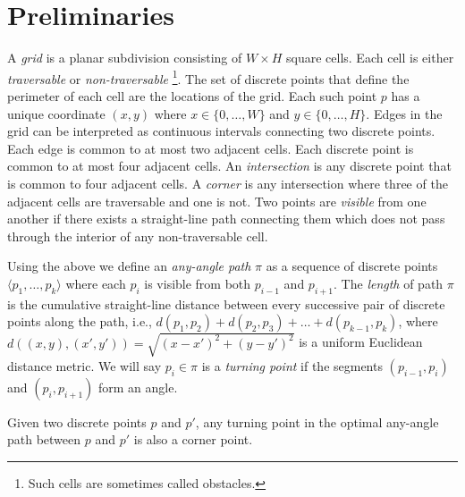 \section{Preliminaries}
A \emph{grid} is a planar subdivision consisting of $W \times H$ square cells.
Each cell is either \emph{traversable} or \emph{non-traversable}
\footnote{Such cells are sometimes called obstacles.}.
The set of discrete points that define the perimeter of each cell are the locations
of the grid. Each such point $p$ has a unique coordinate $(x, y)$
where $x \in \{0,\dots,W\}$ and $y \in \{0,\dots,H\}$.
Edges in the grid can be interpreted as continuous intervals connecting two 
discrete points. Each edge is common to at most two adjacent cells. Each discrete 
point is common to at most four adjacent cells.
An \emph{intersection} is any discrete point that is common to
four adjacent cells. A \emph{corner} is any intersection where three of the
adjacent cells are traversable and one is not. 
Two points are \emph{visible} from one another if there exists a 
straight-line path connecting them which does not pass through the interior of any
 non-traversable cell.

Using the above we define an \emph{any-angle path} $\pi$ as a sequence of discrete points 
$\langle p_1,\dots,p_k \rangle$ where each $p_{i}$ is visible from both $p_{i-1}$
and $p_{i+1}$.
The \emph{length} of path $\pi$ 
is the cumulative straight-line distance between every successive
pair of discrete points along the path, 
i.e., $d(p_1,p_2) + d(p_2,p_3) + \dots + d(p_{k-1},p_k)$, 
where $d((x,y), (x',y'))= \sqrt{(x-x')^2 + (y-y')^2}$ 
is a uniform Euclidean distance metric.
We will say $p_i \in \pi$ is a \emph{turning point} if the segments
$(p_{i-1}, p_i)$ and $(p_i, p_{i+1})$ form an angle.
\\
\begin{lemm}
\label{lemma::corner}
  Given two discrete points $p$ and $p'$, 
  any turning point in the optimal any-angle path between $p$ and $p'$ 
  is also a corner point.
\end{lemm}


